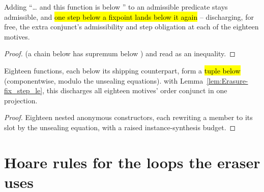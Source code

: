 \begin{lemma}
\label{lem:Erasure-fix_step_le}
\leanok
{}
 Adding ``\ldots{} and this function is below '' to an admissible predicate
stays admissible, and \hl{one step below a fixpoint lands below it again} -- discharging, for free,
the extra conjunct's admissibility and step obligation at each of the eighteen motives.
\end{lemma}
\begin{proof}
\leanok
{}
  (a chain below  has supremum below ) and
 read as an inequality.
\end{proof}

\begin{lemma}
\label{lem:Erasure-mutual_le_of}
\leanok
{}
 Eighteen functions, each below its shipping counterpart, form a \hl{tuple below
} (componentwise, modulo the unsealing equations).
 with Lemma~\ref{lem:Erasure-fix_step_le}, this discharges all eighteen motives' order
conjunct in one projection.
\end{lemma}
\begin{proof}
\leanok
{}
 Eighteen nested anonymous constructors, each rewriting a member to its slot by the
unsealing equation, with a raised instance-synthesis budget.
\end{proof}

\section{Hoare rules for the loops the eraser uses}
\label{sec:run:loops}

